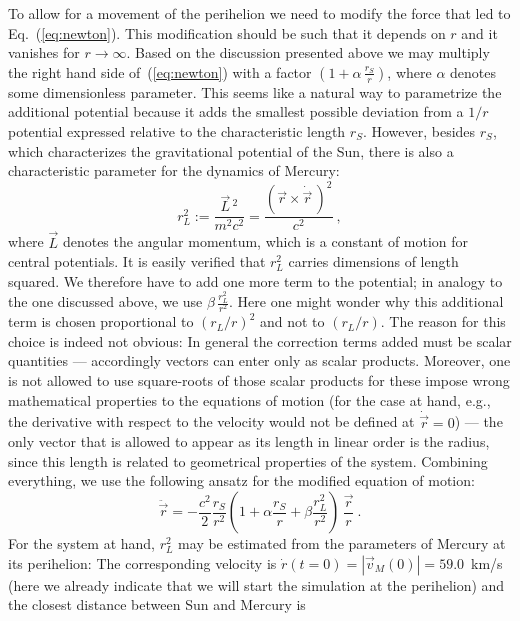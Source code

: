 \documentclass[12pt,ngerman,american]{iopart}
\newcommand{\abs}[1]{\left\vert #1 \right\vert}
\begin{document}
To allow for a movement of the perihelion we need to modify the force that led to Eq.~(\ref{eq:newton}).
This modification should be such that it depends on $r$ and it vanishes for $r\to \infty$.
Based on the discussion presented above we may multiply the right hand side of~(\ref{eq:newton}) with a factor
$(1+\alpha \, \frac{r_S}{r} )$, where $\alpha$ denotes some dimensionless parameter.
This seems like a natural way to parametrize the additional potential because it adds the smallest possible deviation from a $1/r$ potential expressed relative to the characteristic length $r_S$.
However, besides $r_S$, which characterizes the gravitational potential of the Sun, there is also a characteristic parameter for the dynamics of Mercury:
\begin{equation}
r_L^2 := \frac{\vec L\,^2}{m^2c^2}= \frac{{(\vec r\times \dot{\vec r} \, )}^2}{c^2} \ , \label{a2def}
\end{equation}
where $\vec L$ denotes the angular momentum, which is a constant of motion for central potentials.
It is easily verified that $r_L^2$ carries dimensions of length squared.
We therefore have to add one more term to the potential; in analogy to the one discussed above, we use $\beta \, \frac{r_L^2}{r^2}$.
Here one might wonder why this additional term is chosen proportional to $(r_L/r)^2$ and not to $(r_L/r)$. The reason for this choice
is indeed not obvious: In general the correction terms added must be scalar quantities --- accordingly vectors can enter only
as scalar products. Moreover, one is not allowed to use square-roots of those scalar products for these impose
wrong mathematical properties to the equations of motion (for the case at hand, e.g., the derivative with
respect to the velocity would not be defined at $\dot{\vec r}=0$) --- the only vector that is allowed to appear as its length in linear order
is the radius, since this length is related to geometrical properties of the system.  
Combining everything, we use the following ansatz for the modified equation of motion:
\begin{equation}
\ddot{\vec r} = - \frac{c^2}{2}\frac{r_S}{r^2}\left(1+\alpha\frac{r_S}{r}+\beta\frac{r_L^2}{r^2}\right) \, \frac{\vec{r}}{r} \ .
\label{eq:newton_art}
\end{equation}
For the system at hand, $r_L^2$ may be estimated from the parameters of Mercury at its perihelion: The corresponding velocity is
 $\dot{ r}(t=0)=\abs{\vec v_M(0)} = 59.0$~km/s (here we already indicate that we will start the simulation at the perihelion) and the closest distance between Sun and Mercury is
\end{document}
